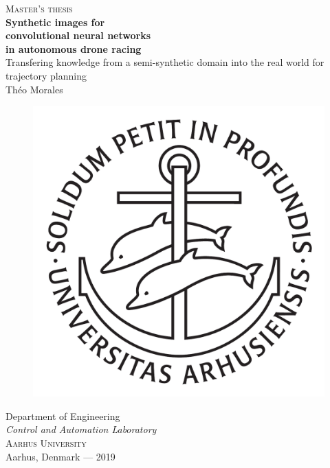 \newpage
\thispagestyle{empty}
\begin{center}
	\textsc{\large Master's thesis}\\[4cm]		%
	\textbf{\Large Synthetic images for\\convolutional neural
	networks\\[0.2cm]in autonomous drone racing} \\[1cm]
	{\large Transfering knowledge from a semi-synthetic domain into the real
	world for trajectory planning}\\[1cm]
	{\large Théo Morales}
	
	\vfill	
	\begin{figure}[H]
	\centering
	\includegraphics[width=0.2\pdfpagewidth]{figure/auxiliary/ausegl_sort.pdf} \\	
	\end{figure}	\vspace{5mm}	
	
	Department of Engineering\\
	\emph{Control and Automation Laboratory}\\
	\textsc{Aarhus University} \\
	Aarhus, Denmark — 2019\\
\end{center}


